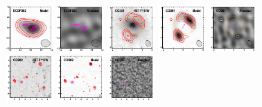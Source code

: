 \documentclass[iop]{emulateapj}
\begin{document}
\begin{figure}[!tbp]
\begin{centering}
\includegraphics[width=0.162\textwidth]{../Figures/modelfit/ECDFS02_model_bestfit.pdf}
\includegraphics[width=0.162\textwidth]{../Figures/modelfit/ECDFS02_residual_bestfit.pdf}
\includegraphics[width=0.162\textwidth]{../Figures/modelfit/COS01_optical_bestfit.pdf}
\includegraphics[width=0.162\textwidth]{../Figures/modelfit/COS01_model_bestfit.pdf}
\includegraphics[width=0.162\textwidth]{../Figures/modelfit/COS01_residual_bestfit.pdf}
\includegraphics[width=0.162\textwidth]{../Figures/modelfit/COS02_optical_bestfit.pdf}
\includegraphics[width=0.162\textwidth]{../Figures/modelfit/COS02_model_bestfit.pdf}
\includegraphics[width=0.162\textwidth]{../Figures/modelfit/COS02_residual_bestfit.pdf}

\end{centering}
\end{figure}
\end{document}
